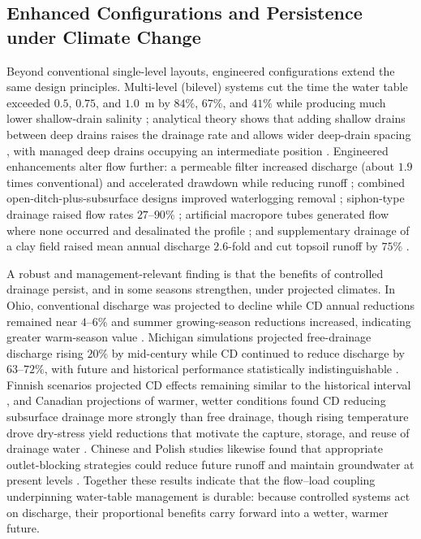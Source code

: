 \subsection{Enhanced Configurations and Persistence under Climate Change}

Beyond conventional single-level layouts, engineered configurations extend the
same design principles. Multi-level (bilevel) systems cut the time the water
table exceeded $0.5$, $0.75$, and $1.0$~m by $84\%$, $67\%$, and $41\%$ while
producing much lower shallow-drain salinity \parencite{Hornbuckle2007};
analytical theory shows that adding shallow drains between deep drains raises
the drainage rate and allows wider deep-drain spacing
\parencite{Hornbuckle2012}, with managed deep drains occupying an intermediate
position \parencite{Ayars2006b,Christen2001b}. Engineered enhancements alter
flow further: a permeable filter increased discharge (about $1.9$ times
conventional) and accelerated drawdown while reducing runoff
\parencite{Tao2016,Tao2017}; combined open-ditch-plus-subsurface designs
improved waterlogging removal \parencite{Ren2021,Tao2025}; siphon-type drainage
raised flow rates $27$--$90\%$ \parencite{Ren2023}; artificial macropore tubes
generated flow where none occurred and desalinated the profile
\parencite{Chen2021}; and supplementary drainage of a clay field raised mean
annual discharge $2.6$-fold and cut topsoil runoff by $75\%$
\parencite{Häggblom2019}.

A robust and management-relevant finding is that the benefits of controlled
drainage persist, and in some seasons strengthen, under projected climates. In
Ohio, conventional discharge was projected to decline while CD annual
reductions remained near $4$--$6\%$ and summer growing-season reductions
increased, indicating greater warm-season value \parencite{Pease2017}. Michigan
simulations projected free-drainage discharge rising $20\%$ by mid-century while
CD continued to reduce discharge by $63$--$72\%$, with future and historical
performance statistically indistinguishable \parencite{BinShokrana2023}.
Finnish scenarios projected CD effects remaining similar to the historical
interval \parencite{Salla2022}, and Canadian projections of warmer, wetter
conditions found CD reducing subsurface drainage more strongly than free
drainage, though rising temperature drove dry-stress yield reductions that
motivate the capture, storage, and reuse of drainage water
\parencite{Ndulue2024,Gunn2018}. Chinese and Polish studies likewise found that
appropriate outlet-blocking strategies could reduce future runoff and maintain
groundwater at present levels \parencite{Awad2021,Sojka2020}. Together these
results indicate that the flow--load coupling underpinning water-table
management is durable: because controlled systems act on discharge, their
proportional benefits carry forward into a wetter, warmer future.